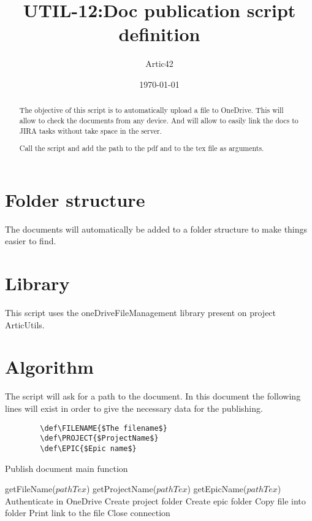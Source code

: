\def\MYTITLE{UTIL-12:Doc publication script definition}
\def\MYNAME{Artic42}


\usepackage{dirtree}


    \title{\MYTITLE}
    \author{\MYNAME}
    \date{\today}
    \maketitle
    \thispagestyle{firstPage}

    \begin{abstract}
        The objective of this script is to automatically upload a file to OneDrive. This will allow to check the documents from any device. And will allow to easily link the docs to JIRA tasks without take space in the server.

        Call the script and add the path to the pdf and to the tex file as arguments.
    \end{abstract}

    \section{Folder structure}
    The documents will automatically be added to a folder structure to make things easier to find.
    \vspace{12pt}
    \renewcommand{\baselinestretch}{1.3}
    \renewcommand{\baselinestretch}{1}
    \section{Library}
    This script uses the oneDriveFileManagement library present on project ArticUtils.
    \section{Algorithm}
    The script will ask for a path to the document. In this document the following lines will exist in order to give the necessary data for the publishing.
    \begin{verbatim}
        \def\FILENAME{$The filename$}
        \def\PROJECT{$ProjectName$}
        \def\EPIC{$Epic name$}
    \end{verbatim}
    \begin{algorithm}[h!]
        \caption{Publish document main function}
    \begin{algorithmic}
        \State getFileName($pathTex$)
        \State getProjectName($pathTex$)
        \State getEpicName($pathTex$)
        \State Authenticate in OneDrive
            \State Create project folder
        \EndIf
            \State Create epic folder
        \EndIf
        \State Copy file into folder
        \State Print link to the file
        \State Close connection
        \EndFunction
    \end{algorithmic}
    \end{algorithm}

